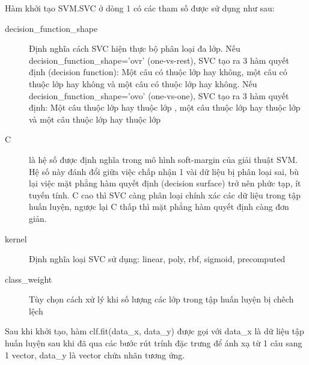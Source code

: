Hàm khởi tạo SVM.SVC ở dòng 1 có các tham số được sử dụng như sau:
\begin{description}
\item[decision\_function\_shape] Định nghĩa cách SVC hiện thực bộ phân loại đa lớp. Nếu decision\_function\_shape='ovr' (one-vs-rest), SVC tạo ra 3 hàm quyết định (decision function): Một câu có thuộc lớp \tichcuc hay không, một câu có thuộc lớp \tieucuc hay không và một câu có thuộc lớp \trungtinh hay không. Nếu decision\_function\_shape='ovo' (one-vs-one), SVC tạo ra 3 hàm quyết định: Một câu thuộc lớp \tichcuc hay thuộc lớp \tieucuc, một câu thuộc lớp \tieucuc hay thuộc lớp \trungtinh và một câu thuộc lớp \trungtinh hay thuộc lớp \tichcuc
\item[C] là hệ số được định nghĩa trong mô hình soft-margin của giải thuật SVM. Hệ số này đánh đổi giữa việc chấp nhận 1 vài dữ liệu bị phân loại sai, bù lại việc mặt phẳng hàm quyết định (decision surface) trở nên phức tạp, ít tuyến tính. C cao thì SVC càng phân loại chính xác các dữ liệu trong tập huấn luyện, ngược lại C thấp thì mặt phẳng hàm quyết định càng đơn giản.
\item[kernel] Định nghĩa loại  SVC sử dụng: linear, poly, rbf, sigmoid, precomputed
\item[class\_weight] Tùy chọn cách xử lý khi số lượng các lớp trong tập huấn luyện bị chêch lệch
\end{description}

Sau khi khởi tạo, hàm clf.fit(data\_x, data\_y) được gọi với data\_x là dữ liệu tập huấn luyện sau khi đã qua các bước rút trính đặc trưng để ánh xạ từ 1 câu sang 1 vector, data\_y là vector chứa nhãn tương ứng.